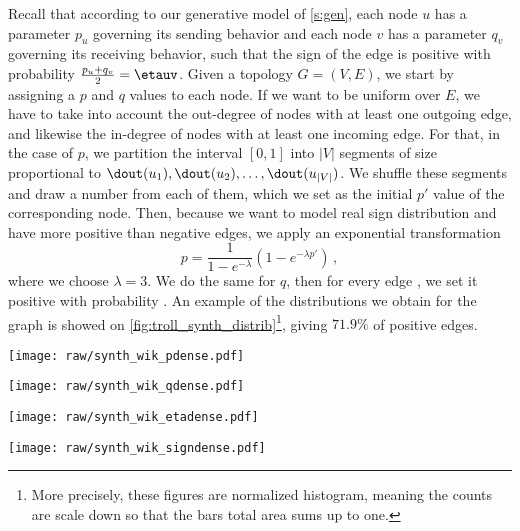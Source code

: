 Recall that according to our generative model of \autoref{s:gen}, each node $u$ has a parameter $p_u$
governing its sending behavior and each node $v$ has a parameter $q_v$ governing its receiving
behavior, such that the sign of the edge \euv{} is positive with probability $\frac{p_u+q_v}{2} =
\etauv$. Given a topology $G=(V,E)$, we start by assigning a $p$ and $q$ values to each node. If we
want \etauv{} to be uniform over $E$, we have to take into account the out-degree of nodes with at
least one outgoing edge, and likewise the in-degree of nodes with at least one incoming edge. For
that, in the case of $p$, we partition the interval $[0,1]$ into $|V|$ segments of size proportional
to $\dout(u_1),
\dout(u_2), \ldots, \dout(u_{|V|})$. We shuffle these segments and draw a number \uar{} from each of
them, which we set as the initial $p'$ value of the corresponding node. Then, because we want to model real
sign distribution and have more
positive than negative edges, we apply an exponential transformation \[ p = \frac{1}{1-e^{-\lambda}}
\left( 1-e^{-\lambda p'} \right) \,,\] where we choose $\lambda=3$. We do the same for $q$, then for
every edge \euv{}, we set it positive with probability \etauv{}. An example of the distributions we
obtain for the \wik{} graph is showed on \autoref{fig:troll_synth_distrib}\footnote{More precisely,
these figures are normalized histogram, meaning the counts are scale down so that the bars total
area sums up to one.}, giving $71.9\%$ of positive edges.

\vspace{\baselineskip}
\noindent\begin{minipage}{187mm} 
  \begin{minipage}{46mm}
    \centering
    \texttt{[image: raw/synth\_wik\_pdense.pdf]}
  \end{minipage}%
  \begin{minipage}{46mm}
    \centering 
    \texttt{[image: raw/synth\_wik\_qdense.pdf]} 
  \end{minipage} 
  \begin{minipage}{46mm}
    \centering 
    \texttt{[image: raw/synth\_wik\_etadense.pdf]} 
  \end{minipage} 
  \begin{minipage}{46mm}
    \centering 
    \texttt{[image: raw/synth\_wik\_signdense.pdf]}
  \end{minipage} 
  \label{fig:troll_synth_distrib} 
\end{minipage}
\vspace{\baselineskip}

